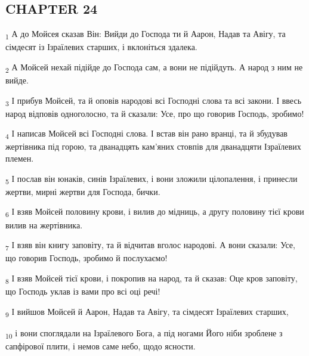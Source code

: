 \subsection{CHAPTER 24}
\begin{tcolorbox}
\textsubscript{1} А до Мойсея сказав Він: Вийди до Господа ти й Аарон, Надав та Авігу, та сімдесят із Ізраїлевих старших, і вклоніться здалека.
\end{tcolorbox}
\begin{tcolorbox}
\textsubscript{2} А Мойсей нехай підійде до Господа сам, а вони не підійдуть. А народ з ним не вийде.
\end{tcolorbox}
\begin{tcolorbox}
\textsubscript{3} І прибув Мойсей, та й оповів народові всі Господні слова та всі закони. І ввесь народ відповів одноголосно, та й сказали: Усе, про що говорив Господь, зробимо!
\end{tcolorbox}
\begin{tcolorbox}
\textsubscript{4} І написав Мойсей всі Господні слова. І встав він рано вранці, та й збудував жертівника під горою, та дванадцять кам'яних стовпів для дванадцяти Ізраїлевих племен.
\end{tcolorbox}
\begin{tcolorbox}
\textsubscript{5} І послав він юнаків, синів Ізраїлевих, і вони зложили цілопалення, і принесли жертви, мирні жертви для Господа, бички.
\end{tcolorbox}
\begin{tcolorbox}
\textsubscript{6} І взяв Мойсей половину крови, і вилив до мідниць, а другу половину тієї крови вилив на жертівника.
\end{tcolorbox}
\begin{tcolorbox}
\textsubscript{7} І взяв він книгу заповіту, та й відчитав вголос народові. А вони сказали: Усе, що говорив Господь, зробимо й послухаємо!
\end{tcolorbox}
\begin{tcolorbox}
\textsubscript{8} І взяв Мойсей тієї крови, і покропив на народ, та й сказав: Оце кров заповіту, що Господь уклав із вами про всі оці речі!
\end{tcolorbox}
\begin{tcolorbox}
\textsubscript{9} І вийшов Мойсей й Аарон, Надав та Авігу, та сімдесят Ізраїлевих старших,
\end{tcolorbox}
\begin{tcolorbox}
\textsubscript{10} і вони споглядали на Ізраїлевого Бога, а під ногами Його ніби зроблене з сапфірової плити, і немов саме небо, щодо ясности.
\end{tcolorbox}
